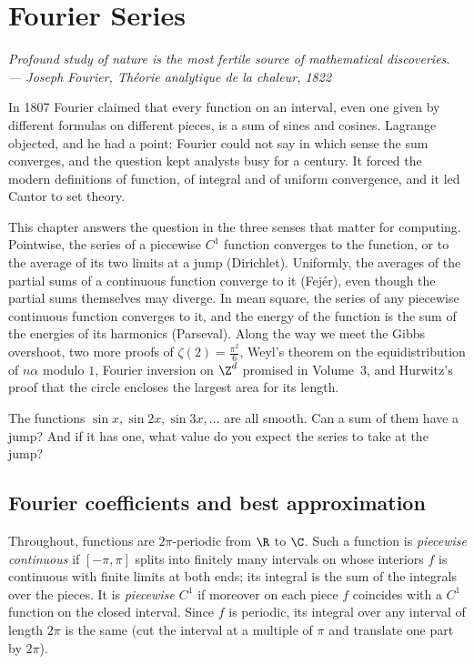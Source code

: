 \chapter{Fourier Series}

\begin{center}\itshape
Profound study of nature is the most fertile source of mathematical discoveries.\\
\upshape --- Joseph Fourier, \emph{Th\'eorie analytique de la chaleur}, 1822
\end{center}

In 1807 Fourier claimed that every function on an interval, even one given by different formulas on different pieces,
is a sum of sines and cosines. Lagrange objected, and he had a point: Fourier could not say in which sense the sum
converges, and the question kept analysts busy for a century. It forced the modern definitions of function, of
integral and of uniform convergence, and it led Cantor to set theory.

This chapter answers the question in the three senses that matter for computing. Pointwise, the series of a piecewise
$C^1$ function converges to the function, or to the average of its two limits at a jump (Dirichlet). Uniformly, the
averages of the partial sums of a continuous function converge to it (Fej\'er), even though the partial sums themselves
may diverge. In mean square, the series of any piecewise continuous function converges to it, and the energy of the
function is the sum of the energies of its harmonics (Parseval). Along the way we meet the Gibbs overshoot, two more
proofs of $\zeta(2)=\frac{\pi^2}6$, Weyl's theorem on the equidistribution of $n\alpha$ modulo $1$, Fourier inversion on $\Z^d$
promised in Volume~3, and Hurwitz's proof that the circle encloses the largest area for its length.

\begin{think}
The functions $\sin x,\sin2x,\sin3x,\dots$ are all smooth. Can a sum of them have a jump? And if it has one, what value do
you expect the series to take at the jump?
\end{think}

\section{Fourier coefficients and best approximation}

Throughout, functions are $2\pi$-periodic from $\R$ to $\C$. Such a function is \emph{piecewise continuous} if $[-\pi,\pi]$ splits
into finitely many intervals on whose interiors $f$ is continuous with finite limits at both ends; its integral is the
sum of the integrals over the pieces. It is \emph{piecewise $C^1$} if moreover on each piece $f$ coincides with a $C^1$ function
on the closed interval. Since $f$ is periodic, its integral over any interval of length $2\pi$ is the same (cut the interval
at a multiple of $\pi$ and translate one part by $2\pi$).

